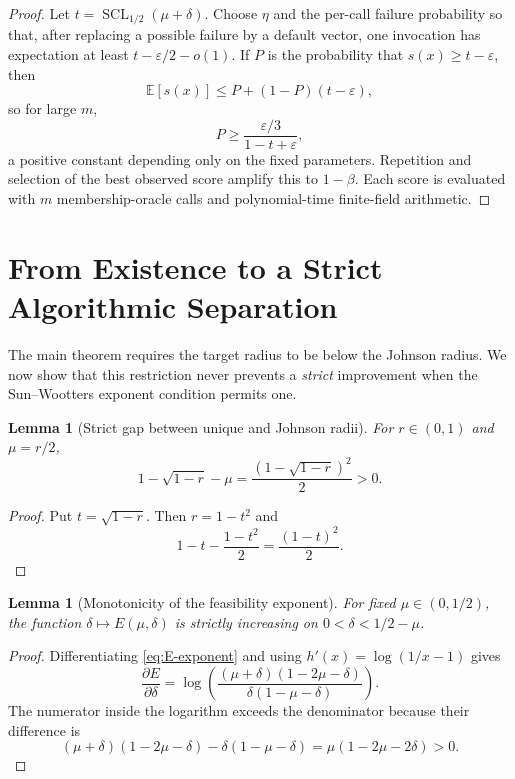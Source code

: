 \documentclass[11pt,letterpaper]{article}
\newtheorem{lemma}[theorem]{Lemma}
\theoremstyle{definition}
\newcommand{\SCL}{\operatorname{SCL}}
\newcommand{\E}{\mathbb{E}}
\begin{document}
\begin{proof}
Let $t=\SCL_{1/2}(\mu+\delta)$.  Choose $\eta$ and the per-call failure probability so that, after replacing a possible failure by a default vector, one invocation has expectation at least $t-\varepsilon/2-o(1)$.  If $P$ is the probability that $s(x)\ge t-\varepsilon$, then
\[
   \E[s(x)]\le P+(1-P)(t-\varepsilon),
\]
so for large $m$,
\[
   P\ge\frac{\varepsilon/3}{1-t+\varepsilon},
\]
a positive constant depending only on the fixed parameters.  Repetition and selection of the best observed score amplify this to $1-\beta$.  Each score is evaluated with $m$ membership-oracle calls and polynomial-time finite-field arithmetic.
\end{proof}

\section{From Existence to a Strict Algorithmic Separation}

The main theorem requires the target radius to be below the Johnson radius.  We now show that this restriction never prevents a \emph{strict} improvement when the Sun--Wootters exponent condition permits one.

\begin{lemma}[Strict gap between unique and Johnson radii]
\label{lem:johnson-gap}
For $r\in(0,1)$ and $\mu=r/2$,
\begin{equation}
   1-\sqrt{1-r}-\mu
   =\frac{(1-\sqrt{1-r})^2}{2}>0.
   \label{eq:johnson-gap}
\end{equation}
\end{lemma}

\begin{proof}
Put $t=\sqrt{1-r}$.  Then $r=1-t^2$ and
\[
   1-t-\frac{1-t^2}{2}=\frac{(1-t)^2}{2}.
\]
\end{proof}

\begin{lemma}[Monotonicity of the feasibility exponent]
\label{lem:E-monotone}
For fixed $\mu\in(0,1/2)$, the function $\delta\mapsto E(\mu,\delta)$ is strictly increasing on $0<\delta<1/2-\mu$.
\end{lemma}

\begin{proof}
Differentiating \cref{eq:E-exponent} and using $h'(x)=\log(1/x-1)$ gives
\begin{equation}
   \frac{\partial E}{\partial\delta}
   =\log\!\left(
      \frac{(\mu+\delta)(1-2\mu-\delta)}
           {\delta(1-\mu-\delta)}
      \right).
   \label{eq:E-derivative}
\end{equation}
The numerator inside the logarithm exceeds the denominator because their difference is
\[
   (\mu+\delta)(1-2\mu-\delta)
   -\delta(1-\mu-\delta)
   =\mu(1-2\mu-2\delta)>0.
\]
\end{proof}
\end{document}
